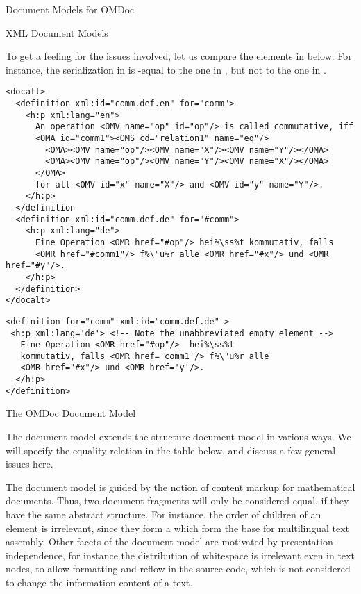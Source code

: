 \begin{module}[id=document-model]
\begin{omgroup}[id=document-model]{Document Models for OMDoc}
\begin{omgroup}[id=xml-DOM]{XML Document Models}
\begin{module}[id=XMLDom]
To get a feeling for the issues involved, let us compare the {\omdoc} elements in
{} below. For instance, the serialization in {}
is {\xml}-equal to the one in {}, but not to the one in
{}.

\begin{lstlisting}[escapechar=\%,label=lst:first,
   index={definition,OMA},caption={An {\omdoc} Definition}]
<docalt>
  <definition xml:id="comm.def.en" for="comm">
    <h:p xml:lang="en">
      An operation <OMV name="op" id="op"/> is called commutative, iff 
      <OMA id="comm1"><OMS cd="relation1" name="eq"/>
        <OMA><OMV name="op"/><OMV name="X"/><OMV name="Y"/></OMA>
        <OMA><OMV name="op"/><OMV name="Y"/><OMV name="X"/></OMA>
      </OMA>
      for all <OMV id="x" name="X"/> and <OMV id="y" name="Y"/>.
    </h:p>
  </definition
  <definition xml:id="comm.def.de" for="#comm">
    <h:p xml:lang="de">
      Eine Operation <OMR href="#op"/> hei%\ss%t kommutativ, falls 
      <OMR href="#comm1"/> f%\"u%r alle <OMR href="#x"/> und <OMR href="#y"/>.
    </h:p>
  </definition>
</docalt>
\end{lstlisting}

\begin{lstlisting}[escapechar=\%,label=lst:second,mathescape,
   index={definition,h:p},
   caption={An {\xml}-equal serialization for {\mylstref{first}}}]
<definition for="comm" xml:id="comm.def.de" >
 <h:p xml:lang='de'> <!-- Note the unabbreviated empty element -->
   Eine Operation <OMR href="#op"/>  hei%\ss%t 
   kommutativ, falls <OMR href='comm1'/> f%\"u%r alle 
   <OMR href="#x"/> und <OMR href='y'/>.
  </h:p>
</definition>
\end{lstlisting}
\end{module}
\end{omgroup}

\begin{omgroup}[id=omdom]{The OMDoc Document Model}
\begin{module}[id=omdom]

The {\omdoc} document model extends the {\xml} structure document model in various ways.
We will specify the equality relation in the table below, and discuss a few general issues
here.

The {\omdoc} document model is guided by the notion of content markup for mathematical
documents. Thus, two document fragments will only be considered equal, if they have the
same abstract structure. For instance, the order of children of an {}
element is irrelevant, since they form a {} which form the
base for multilingual text assembly. Other facets of the {\omdoc} document model are
motivated by presentation-independence, for instance the distribution of whitespace is
irrelevant even in text nodes, to allow formatting and reflow in the source code, which is
not considered to change the information content of a text.


\end{module}
\end{omgroup}
\end{omgroup}
\end{module}
